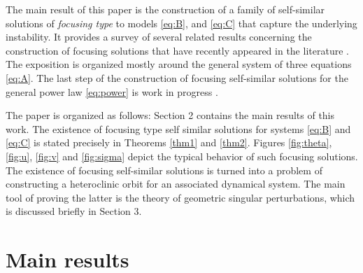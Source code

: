 \documentclass[graybox]{svmult}
\begin{document}
The main result of this paper is the construction of a family of self-similar solutions of {\it focusing type} to models \eqref{eq:B}, and \eqref{eq:C} that capture the underlying instability. It provides a survey of several related results concerning the construction of focusing solutions that
have recently appeared in the literature \cite{KOT14,KLT_2016,LT16}. The exposition is organized mostly around the general system of three equations 
 \eqref{eq:A}. The last step of the construction of focusing self-similar solutions for the general power law \eqref{eq:power} is work in progress \cite{LT16_2}. 

The paper is organized as follows: Section 2 contains the main results of this work. The existence of focusing type self similar solutions for systems \eqref{eq:B} and \eqref{eq:C} is stated precisely in Theorems \ref{thm1} and \ref{thm2}. Figures \ref{fig:theta}, \ref{fig:u}, \ref{fig:v} and \ref{fig:sigma} depict the typical behavior of such focusing solutions.  
The existence of focusing self-similar solutions is turned into a problem of constructing a heteroclinic orbit for an associated dynamical system. 
The main tool of proving the latter is the theory of geometric singular perturbations, \cite{fenichel_geometric_1979} which is  discussed briefly in Section 3. 


\section{Main results}
\end{document}
